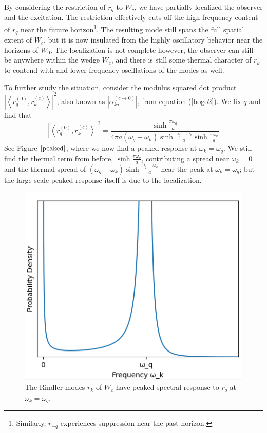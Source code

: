 \documentclass[12pt,a4paper]{article}
\begin{document}
By considering the restriction of $r_q$ to $W_c$, we have partially localized the observer and the excitation. The restriction effectively cuts off the high-frequency content of $r_q$ near the future horizon\footnote{Similarly, $r_{-q}$ experiences suppression near the past horizon.}. The resulting mode still spans the full spatial extent of $W_c$, but it is now insulated from the highly oscillatory behavior near the horizons of $W_0$.  The localization is not complete however, the observer can still be anywhere within the wedge $W_c$, and there is still some thermal character of $r_k$ to contend with and lower frequency oscillations of the modes as well.

To further study the situation, consider the modulus squared dot product $\left|\left<r_q^{(0)}, r_k^{(c)} \right>\right|^2$, also known as $\left|\alpha^{(c \rightarrow 0)}_{kq}\right|$, from equation (\ref{bogo2}).  We fix $q$ and find that
\begin{equation}
  \left|\left<r_q^{(0)}, r_k^{(c)} \right>\right|^2 = \frac{\sinh \frac{\pi \omega_q}{a}}{4\pi a (\omega_q - \omega_k) \sinh \frac{\omega_q - \omega_k}{a} \sinh \frac{\pi \omega_k}{a}}
\end{equation}
See Figure $\ref{peaked}$, where we now find a peaked response at $\omega_k = \omega_q$.  We still find the thermal term from before, $\sinh \frac{\pi \omega_k}{a}$, contributing a spread near $\omega_k = 0$ and the thermal spread of $(\omega_q - \omega_k) \sinh \frac{\omega_q - \omega_k}{a}$ near the peak at $\omega_k = \omega_q$; but the large scale peaked response itself is due to the localization.

\begin{figure}[h]
  \centering
\includegraphics[scale=0.6]{peaked.png}
\caption{The Rindler modes $r_k$ of $W_c$ have peaked spectral response to $r_q$ at $\omega_k = \omega_q$.}
\label{peaked}
\end{figure}
\end{document}
